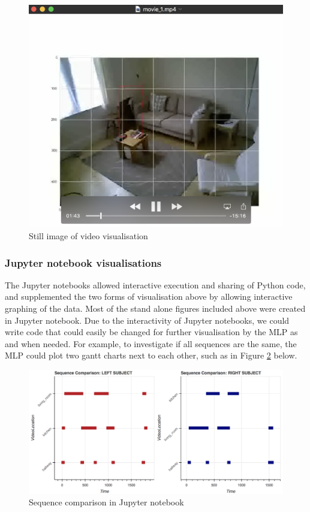 \documentclass[fleqn,10pt]{SelfArx} %
\begin{document}
\begin{figure}[!h] \centering
	\includegraphics[scale=0.4]{video} 
	\caption{Still image of video visualisation}
	\label{fig:video}
\end{figure}

\subsubsection{Jupyter notebook visualisations}
The Jupyter notebooks allowed interactive execution and sharing of Python code, and supplemented the two forms of visualisation above by allowing interactive graphing of the data. Most of the stand alone figures included above were created in Jupyter notebook. Due to the interactivity of Jupyter notebooks, we could write code that could easily be changed for further visualisation by the MLP as and when needed. For example, to investigate if all sequences are the same, the MLP could plot two gantt charts next to each other, such as in Figure \ref{fig:seq-comp} below. \\

\begin{figure}[!h] \centering
	\includegraphics[scale=0.3]{seq-comp} 
	\caption{Sequence comparison in Jupyter notebook}
	\label{fig:seq-comp}
\end{figure}
\end{document}
